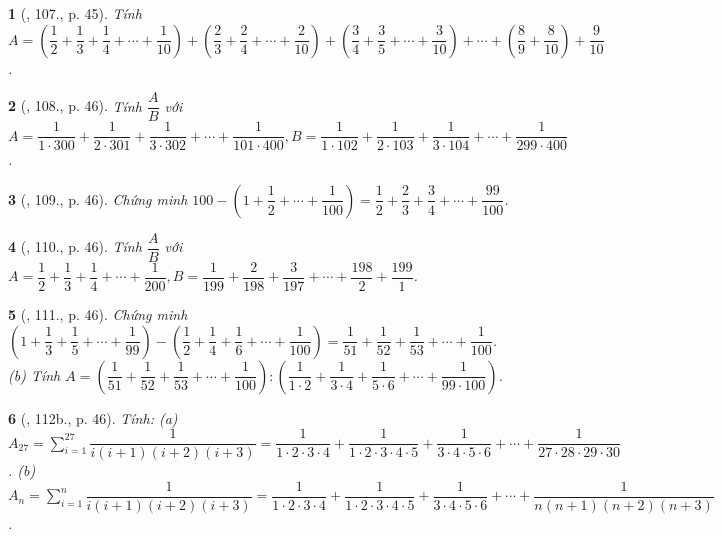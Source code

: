 \documentclass{article}
\newtheorem{baitoan}{}
\begin{document}
\begin{baitoan}[\cite{Binh_Toan_6_tap_2}, 107., p. 45]
	Tính $A = \left(\dfrac{1}{2} + \dfrac{1}{3} + \dfrac{1}{4} + \cdots + \dfrac{1}{10}\right) + \left(\dfrac{2}{3} + \dfrac{2}{4} + \cdots + \dfrac{2}{10}\right) + \left(\dfrac{3}{4} + \dfrac{3}{5} + \cdots + \dfrac{3}{10}\right) + \cdots + \left(\dfrac{8}{9} + \dfrac{8}{10}\right) + \dfrac{9}{10}$.
\end{baitoan}

\begin{baitoan}[\cite{Binh_Toan_6_tap_2}, 108., p. 46]
	Tính $\dfrac{A}{B}$ với $A = \dfrac{1}{1\cdot300} + \dfrac{1}{2\cdot301} + \dfrac{1}{3\cdot302} + \cdots + \dfrac{1}{101\cdot400},B = \dfrac{1}{1\cdot102} + \dfrac{1}{2\cdot103} + \dfrac{1}{3\cdot104} + \cdots + \dfrac{1}{299\cdot400}$.
\end{baitoan}

\begin{baitoan}[\cite{Binh_Toan_6_tap_2}, 109., p. 46]
	Chứng minh $100 - \left(1 + \dfrac{1}{2} + \cdots + \dfrac{1}{100}\right) = \dfrac{1}{2} + \dfrac{2}{3} + \dfrac{3}{4} + \cdots + \dfrac{99}{100}$.
\end{baitoan}

\begin{baitoan}[\cite{Binh_Toan_6_tap_2}, 110., p. 46]
	Tính $\dfrac{A}{B}$ với $A = \dfrac{1}{2} + \dfrac{1}{3} + \dfrac{1}{4} + \cdots + \dfrac{1}{200},B = \dfrac{1}{199} + \dfrac{2}{198} + \dfrac{3}{197} + \cdots + \dfrac{198}{2} + \dfrac{199}{1}$.
\end{baitoan}

\begin{baitoan}[\cite{Binh_Toan_6_tap_2}, 111., p. 46]
	Chứng minh $\left(1 + \dfrac{1}{3} + \dfrac{1}{5} + \cdots + \dfrac{1}{99}\right) - \left(\dfrac{1}{2} + \dfrac{1}{4} + \dfrac{1}{6} + \cdots + \dfrac{1}{100}\right) = \dfrac{1}{51} + \dfrac{1}{52} + \dfrac{1}{53} + \cdots + \dfrac{1}{100}$. (b) Tính $A = \left(\dfrac{1}{51} + \dfrac{1}{52} + \dfrac{1}{53} + \cdots + \dfrac{1}{100}\right):\left(\dfrac{1}{1\cdot2} + \dfrac{1}{3\cdot4} + \dfrac{1}{5\cdot6} + \cdots + \dfrac{1}{99\cdot100}\right)$.
\end{baitoan}

\begin{baitoan}[\cite{Binh_Toan_6_tap_2}, 112b., p. 46]
	Tính: (a) $A_{27} = \sum_{i=1}^{27} \dfrac{1}{i(i + 1)(i + 2)(i + 3)} = \dfrac{1}{1\cdot2\cdot3\cdot4} + \dfrac{1}{1\cdot2\cdot3\cdot4\cdot5} + \dfrac{1}{3\cdot4\cdot5\cdot6} + \cdots + \dfrac{1}{27\cdot28\cdot29\cdot30}$. (b) $A_n = \sum_{i=1}^n \dfrac{1}{i(i + 1)(i + 2)(i + 3)} = \dfrac{1}{1\cdot2\cdot3\cdot4} + \dfrac{1}{1\cdot2\cdot3\cdot4\cdot5} + \dfrac{1}{3\cdot4\cdot5\cdot6} + \cdots + \dfrac{1}{n(n + 1)(n + 2)(n + 3)}$.
\end{baitoan}
\end{document}
